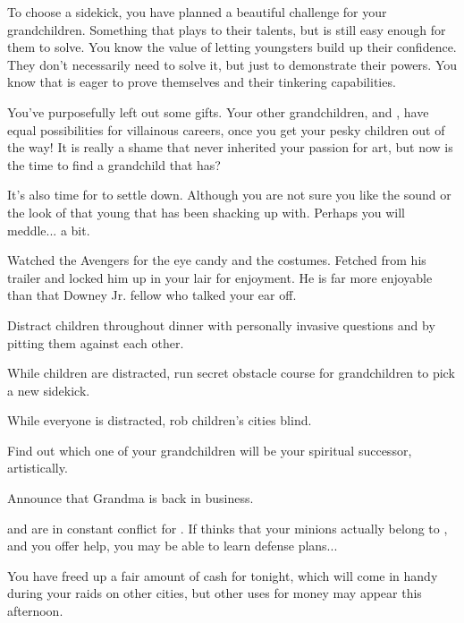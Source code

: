 \documentclass[char]{LRSguildcamp1}
\begin{document}
To choose a sidekick, you have planned a beautiful challenge for your grandchildren. Something that plays to their talents, but is still easy enough for them to solve. You know the value of letting youngsters build up their confidence. They don't necessarily need to solve it, but just to demonstrate their powers. You know that \cTeen{} is eager to prove themselves and their tinkering capabilities. 

You've purposefully left out some gifts. Your other grandchildren, \cGrad{} and \cTween{}, have equal possibilities for villainous careers, once you get your pesky children out of the way! It is really a shame that \cYoungest {} never inherited your passion for art, but now is the time to find a grandchild that has? 

It's also time for \cYoungest {} to settle down. Although you are not sure you like the sound or the look of that young \cYS{\hero} that \cYoungest{} has been shacking up with. Perhaps you will meddle... a bit. 

Watched the Avengers for the eye candy and the costumes. Fetched \cChrisHemsworth{\intro} from his trailer and locked him up in your lair for enjoyment. He is far more enjoyable than that Downey Jr. fellow who talked your ear off. 

\begin{itemz}[Goals]
	\item Distract children throughout dinner with personally invasive questions and by pitting them against each other. 
	\item While children are distracted, run secret obstacle course for grandchildren to pick a new sidekick. 
	\item While everyone is distracted, rob children's cities blind. 
	\item Find out which one of your grandchildren will be your spiritual successor, artistically. 
	\item Announce that Grandma is back in business. 
	
\end{itemz}

\begin{itemz}[Notes]
	\item \cOldest{} and \cOS{} are in constant conflict for \pCityO{}.  If \cOldest{} thinks that your minions actually belong to \cOS{}, and you offer help, you may be able to learn \cOldest{\their} defense plans...
	\item You have freed up a fair amount of cash for tonight, which will come in handy during your raids on other cities, but other uses for money may appear this afternoon.
\end{itemz}
\end{document}
